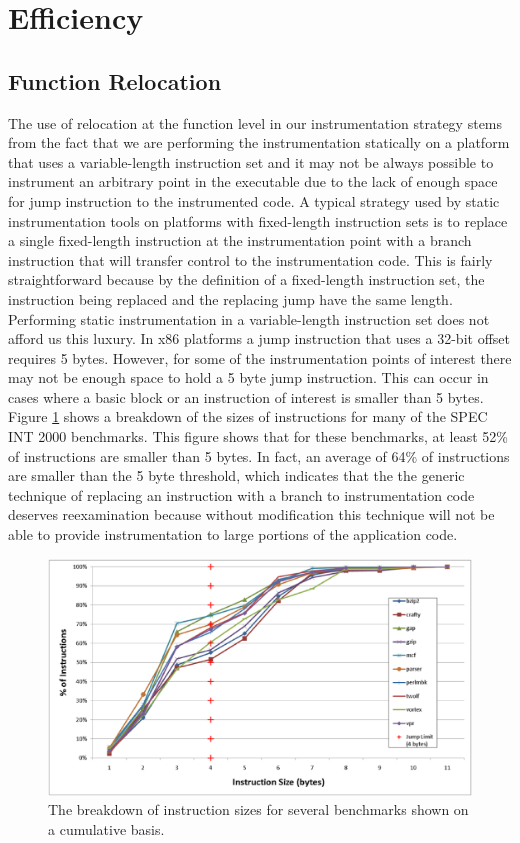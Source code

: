 \section{Efficiency}

\subsection{Function Relocation}
The use of relocation at the function level in our instrumentation strategy stems from the fact
that we are performing the instrumentation statically on a platform that uses a
variable-length instruction set and it may not be always possible to instrument
an arbitrary point in the executable due to the lack of enough space for jump instruction to the instrumented code. 
A typical strategy used by static
instrumentation tools on platforms with fixed-length instruction sets is to
replace a single fixed-length instruction at the instrumentation point with a
branch instruction that will transfer control to the instrumentation code. This is fairly straightforward because by the
definition of a fixed-length instruction set, the instruction being replaced and
the replacing jump have the same length. Performing static instrumentation
in a variable-length instruction set does not afford us this luxury. In x86 platforms a
jump instruction that uses a 32-bit offset requires 5 bytes. However, for some of
the instrumentation points of interest there may not be enough space to hold a 5 byte
jump instruction. This can occur in cases where a basic block or an instruction of interest
is smaller than 5 bytes. Figure \ref{Figure:InstructionSizes} shows a breakdown of the sizes of
instructions for many of the SPEC INT 2000 benchmarks. This figure shows that for these benchmarks,
at least 52\% of instructions are smaller than 5 bytes. In fact, an average of 64\% of instructions
are smaller than the 5 byte threshold, which indicates that the the generic technique of replacing 
an instruction with a branch to instrumentation code deserves reexamination because without modification
this technique will not be able to provide instrumentation to large portions of the application code.

\begin{figure}[ht]
\centering
\label{Figure:InstructionSizes}
\includegraphics[scale=0.4]{instsize.eps}
\caption{The breakdown of instruction sizes for several benchmarks shown on a cumulative basis.}
\end{figure}

